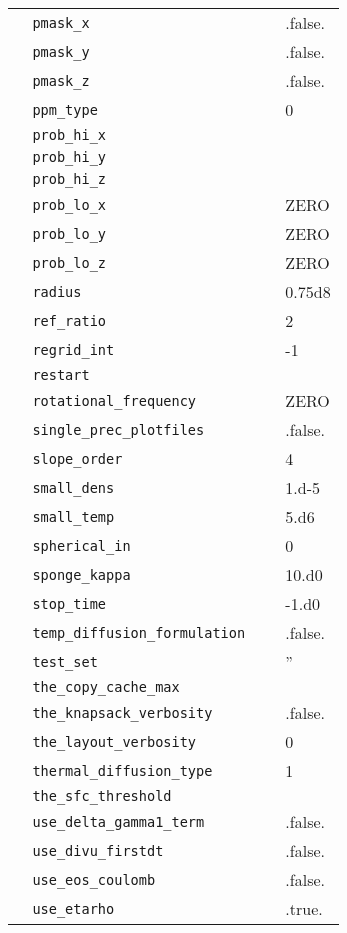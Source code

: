 {\begin{center}
\begin{longtable}{|l|p{3.25in}|l|}
\verb=  pmask_x =  &   &  .false. \\
\verb=  pmask_y =  &   &  .false. \\
\verb=  pmask_z =  &   &  .false. \\
\verb=  ppm_type =  &   &  0 \\
\verb=  prob_hi_x =  &   &  \\
\verb=  prob_hi_y =  &   &  \\
\verb=  prob_hi_z =  &   &  \\
\verb=  prob_lo_x =  &   &  ZERO \\
\verb=  prob_lo_y =  &   &  ZERO \\
\verb=  prob_lo_z =  &   &  ZERO \\
\verb=  radius =  &   &  0.75d8 \\
\verb=  ref_ratio =  &   &  2 \\
\verb=  regrid_int =  &   &  -1 \\
\verb=  restart =  &   &  \\
\verb=  rotational_frequency =  &   &  ZERO \\
\verb=  single_prec_plotfiles =  &   &  .false. \\
\verb=  slope_order =  &   &  4 \\
\verb=  small_dens =  &   &  1.d-5 \\
\verb=  small_temp =  &   &  5.d6 \\
\verb=  spherical_in =  &   &  0 \\
\verb=  sponge_kappa =  &   &  10.d0 \\
\verb=  stop_time =  &   &  -1.d0 \\
\verb=  temp_diffusion_formulation =  &   &  .false. \\
\verb=  test_set =  &   &  '' \\
\verb=  the_copy_cache_max =  &   &  \\
\verb=  the_knapsack_verbosity =  &   &  .false. \\
\verb=  the_layout_verbosity =  &   &  0 \\
\verb=  thermal_diffusion_type =  &   &  1 \\
\verb=  the_sfc_threshold =  &   &  \\
\verb=  use_delta_gamma1_term =  &   &  .false. \\
\verb=  use_divu_firstdt =  &   &  .false. \\
\verb=  use_eos_coulomb =  &   &  .false. \\
\verb=  use_etarho =  &   &  .true. \\

\end{longtable}
\end{center}}
